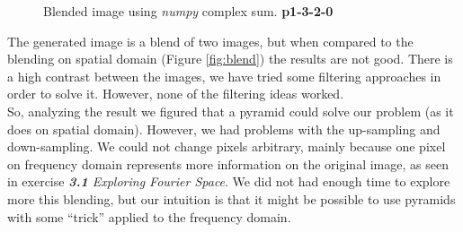 \documentclass[12pt,a4paper]{article}
\begin{document}
\begin{figure}[!h]
	\centering
	{%
		\setlength{\fboxsep}{1pt}%
		\setlength{\fboxrule}{1pt}%
	}%
	\caption{Blended image using \emph{numpy} complex sum. \textbf{p1-3-2-0}}
	\label{fig:p1-3-2-0}
\end{figure}

The generated image is a blend of two images, but when compared to the blending on spatial domain (Figure \ref{fig:blend}) the results are not good. There is a high contrast between the images, we have tried some filtering approaches in order to solve it. However, none of the filtering ideas worked. \\

So, analyzing the result we figured that a pyramid could solve our problem (as it does on spatial domain). However, we had problems with the up-sampling and down-sampling. We could not change pixels arbitrary, mainly because one pixel on frequency domain represents more information on the original image, as seen in exercise \emph{\textbf{3.1} Exploring Fourier Space}. We did not had enough time to explore more this blending, but our intuition is that it might be possible to use pyramids with some ``trick'' applied to the frequency domain.
\end{document}
